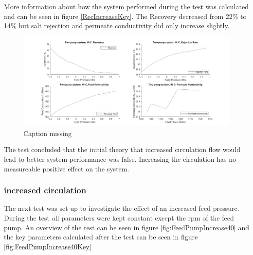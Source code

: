 More information about how the system performed during the test was calculated and can be seen in figure \ref{RecIncreaseKey}. The Recovery decreased from 22\% to 14\%  but salt rejection and permeate conductivity did only increase slightly. 
\begin{figure}[H]
    \centering
    \includegraphics[width=1.1\textwidth]{RecIncrease40Key}
    \caption{Caption missing}
    \label{fig:RecIncreaseKey}
\end{figure} 
\par\bigskip 
\noindent
The test concluded that the initial theory that increased circulation flow would lead to better system performance was false. Increasing the circulation has no measureable positive effect on the system. 

\newpage
\subsubsection{increased circulation}
The next test was set up to investigate the effect of an increased feed pressure. During the test all parameters were kept constant except the rpm of the feed pump. An overview of the test can be seen in figure \ref{fig:FeedPumpIncrease40} and the key parameters calculated after the test can be seen in figure \ref{fig:FeedPumpIncrease40Key} 

